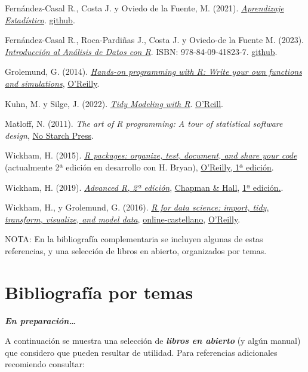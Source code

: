 \documentclass[
]{book}
\theoremstyle{break}
\theoremstyle{nonumberplain}
\begin{document}
Fernández-Casal R., Costa J. y Oviedo de la Fuente, M. (2021). \emph{\href{https://rubenfcasal.github.io/aprendizaje_estadistico}{Aprendizaje Estadístico}}. \href{https://github.com/rubenfcasal/aprendizaje_estadistico}{github}.

Fernández-Casal R., Roca-Pardiñas J., Costa J. y Oviedo-de la Fuente M. (2023). \emph{\href{https://rubenfcasal.github.io/intror}{Introducción al Análisis de Datos con R}}. ISBN: 978-84-09-41823-7. \href{https://github.com/rubenfcasal/intror}{github}.

Grolemund, G. (2014). \emph{\href{https://rstudio-education.github.io/hopr}{Hands-on programming with R: Write your own functions and simulations}}, \href{http://shop.oreilly.com/product/0636920028574.do}{O'Reilly}.

Kuhn, M. y Silge, J. (2022). \emph{\href{https://www.tmwr.org}{Tidy Modeling with R}}. \href{https://amzn.to/35Hn96s}{O'Reill}.

Matloff, N. (2011). \emph{The art of R programming: A tour of statistical software design}, \href{https://www.nostarch.com/artofr.htm}{No Starch Press}.

Wickham, H. (2015). \emph{\href{http://r-pkgs.had.co.nz/}{R packages: organize, test, document, and share your code}} (actualmente 2ª edición en desarrollo con H. Bryan), \href{http://shop.oreilly.com/product/0636920034421.do}{O'Reilly, 1ª edición}.

Wickham, H. (2019). \emph{\href{https://adv-r.hadley.nz/}{Advanced R, 2ª edición}}, \href{https://www.amazon.com/dp/0815384572}{Chapman \& Hall}, \href{http://adv-r.had.co.nz/}{1ª edición.}.

Wickham, H., y Grolemund, G. (2016). \emph{\href{http://r4ds.had.co.nz}{R for data science: import, tidy, transform, visualize, and model data}}, \href{https://es.r4ds.hadley.nz}{online-castellano}, \href{http://shop.oreilly.com/product/0636920034407.do}{O'Reilly}.

NOTA: En la bibliografía complementaria se incluyen algunas de estas referencias, y una selección de libros en abierto, organizados por temas.

\section*{Bibliografía por temas}\label{bibliografuxeda-por-temas}

\textbf{\emph{En preparación\ldots{}}}

A continuación se muestra una selección de \textbf{\emph{libros en abierto}} (y algún manual) que considero que pueden resultar de utilidad.
Para referencias adicionales recomiendo consultar:
\end{document}
